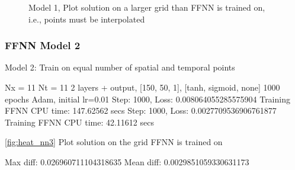 \begin{figure}[H]
\caption{Model 1, Plot solution on a larger grid than FFNN is trained on, i.e., points must be interpolated}
\label{fig:heat_nn2}
\end{figure}

\subsubsection{FFNN Model 2}
Model 2: Train on equal number of spatial and temporal points

Nx = 11
Nt = 11
2 layers + output, [150, 50, 1], [tanh, sigmoid, none] 
1000 epochs
Adam, initial lr=0.01
Step: 1000, Loss: 0.008064055285575904
Training FFNN CPU time: 147.62562 secs
Step: 1000, Loss: 0.0027709536906761877
Training FFNN CPU time: 42.11612 secs

\autoref{fig:heat_nn3} Plot solution on the grid FFNN is trained on

Max diff: 0.026960711104318635
Mean diff: 0.0029851059330631173

